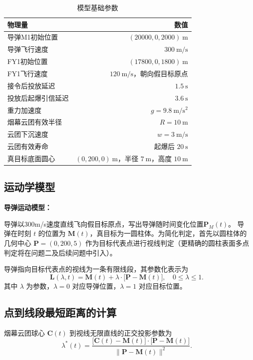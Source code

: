 \documentclass[12pt,a4paper]{article}
\begin{document}
	\begin{table}[htbp]
		\centering
		\caption{模型基础参数}
		\label{tab:para_base}
		\begin{tabular}{l r}
			\toprule
			物理量 & 数值 \\
			\midrule
			导弹M1初始位置 & $(20000,0,2000)\ \mathrm{m}$ \\
			导弹飞行速度 & $300\ \mathrm{m/s}$ \\
			FY1初始位置 & $(17800,0,1800)\ \mathrm{m}$ \\
			FY1飞行速度 & $120\ \mathrm{m/s}$，朝向假目标原点 \\
			接令后投放延迟 & $1.5\ \mathrm{s}$ \\
			投放后起爆引信延迟 & $3.6\ \mathrm{s}$ \\
			重力加速度 & $g=9.8\ \mathrm{m/s^2}$ \\
			烟幕云团有效半径 & $R=10\ \mathrm{m}$ \\
			云团下沉速度 & $w=3\ \mathrm{m/s}$ \\
			云团有效寿命 & 起爆后 $20\ \mathrm{s}$ \\
			真目标底面圆心 & $(0,200,0)\ \mathrm{m}$，半径 $7\ \mathrm{m}$，高度 $10\ \mathrm{m}$ \\
			\bottomrule
		\end{tabular}
	\end{table}
	

	
	\subsection{运动学模型}

	\textbf{导弹运动模型：}
	
	导弹以300m/s速度直线飞向假目标原点，写出导弹随时间变化位置$\boldsymbol{P}_M(t)$。
	导弹在时刻 $t$ 的位置为 $\boldsymbol{M}(t)$，真目标为一圆柱体。为简化判定，首先以圆柱体的几何中心 $\boldsymbol{P}=(0,200,5)$ 作为目标代表点进行视线判定（更精确的圆柱表面多点判定将在问题二及后续问题中引入）。
	
	导弹指向目标代表点的视线为一条有限线段，其参数化表示为
	\[
	\boldsymbol{L}(\lambda,t)=\boldsymbol{M}(t)+\lambda\cdot \bigl[\boldsymbol{P}-\boldsymbol{M}(t)\bigr],\quad 0\le \lambda\le 1.
	\]
	其中 $\lambda$ 为参数，$\lambda=0$ 对应导弹位置，$\lambda=1$ 对应目标位置。
	
	\subsection{点到线段最短距离的计算}
	烟幕云团球心 $\boldsymbol{C}(t)$ 到视线无限直线的正交投影参数为
	\[
	\lambda^{*}(t)=\frac{\bigl[\boldsymbol{C}(t)-\boldsymbol{M}(t)\bigr]\cdot \bigl[\boldsymbol{P}-\boldsymbol{M}(t)\bigr]}{\bigl\|\boldsymbol{P}-\boldsymbol{M}(t)\bigr\|^{2}}.
	\]
	
\end{document}

